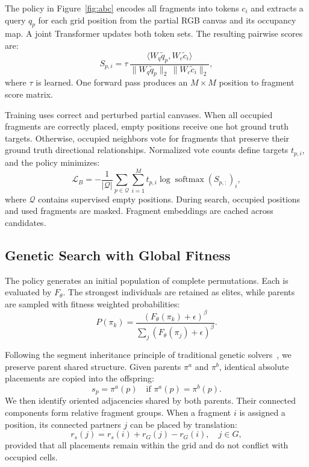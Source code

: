 \documentclass[10pt,twocolumn,letterpaper]{article}
\begin{document}
The policy in Figure~\ref{fig:abc} encodes all fragments into tokens $c_i$ and extracts a query $q_p$ for each grid position from the partial RGB canvas and its occupancy map. A joint Transformer updates both token sets. The resulting pairwise scores are:
\begin{equation}
S_{p,i}=\tau\,
\frac{\langle W_q\tilde q_p,W_c\tilde c_i\rangle}
{\|W_q\tilde q_p\|_2\,\|W_c\tilde c_i\|_2},
\label{eq:gp-policy}
\end{equation}
where $\tau$ is learned. One forward pass produces an $M\times M$ position to fragment score matrix.

Training uses correct and perturbed partial canvases. When all occupied fragments are correctly placed, empty positions receive one hot ground truth targets. Otherwise, occupied neighbors vote for fragments that preserve their ground truth directional relationships. Normalized vote counts define targets $t_{p,i}$, and the policy minimizes:
\begin{equation}
\mathcal L_B=-\frac1{|\mathcal Q|}\sum_{p\in\mathcal Q}\sum_{i=1}^{M}
 t_{p,i}\log\operatorname{softmax}(S_{p,:})_i,
\label{eq:gp-b-loss}
\end{equation}
where $\mathcal Q$ contains supervised empty positions. During search, occupied positions and used fragments are masked. Fragment embeddings are cached across candidates.

\subsection{Genetic Search with Global Fitness}
\label{sec:ga}
\par{}
The policy generates an initial population of complete permutations. Each is evaluated by $F_\theta$. The strongest individuals are retained as elites, while parents are sampled with fitness weighted probabilities:
\begin{equation}
P(\pi_k)=\frac{(F_\theta(\pi_k)+\epsilon)^\beta}
{\sum_j(F_\theta(\pi_j)+\epsilon)^\beta}.
\label{eq:gp-selection}
\end{equation}
\par{}
Following the segment inheritance principle of traditional genetic solvers~\cite{sholomon2013genetic}, we preserve parent shared structure. Given parents $\pi^a$ and $\pi^b$, identical absolute placements are copied into the offspring:
\begin{equation}
s_p=\pi^a(p)\quad\text{if }\pi^a(p)=\pi^b(p).
\label{eq:gp-absolute}
\end{equation}
We then identify oriented adjacencies shared by both parents. Their connected components form relative fragment groups. When a fragment $i$ is assigned a position, its connected partners $j$ can be placed by translation:
\begin{equation}
r_s(j)=r_s(i)+r_G(j)-r_G(i),\quad j\in G,
\label{eq:gp-relative}
\end{equation}
provided that all placements remain within the grid and do not conflict with occupied cells.
\end{document}
